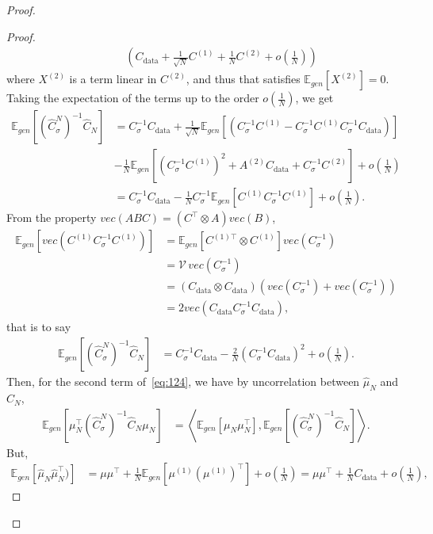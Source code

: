 \documentclass[11pt]{article}
\newcommand{\EE}{\mathbb{E}}
\begin{document}
\begin{proof}
\begin{proof}
\begin{align*}
&\qquad \nonumber \left(C_\mathrm{data} + \frac{1}{\sqrt{N}}   C^{(1)} + \frac{1}{N}  C^{(2)} + o\left( \frac{1}{N}\right)  \right) 
\end{align*}
where $X^{(2)}$ is a term linear in $C^{(2)}$, and thus that satisfies $\EE_{gen}[X^{(2)}] = 0$.
Taking the expectation of the terms up to the order $o\left( \frac{1}{N}\right)$, we get
\begin{align*}
\EE_{gen}\left[ (\hat C^N_\sigma)^{-1} \hat C_N \right] &= C_\sigma^{-1} C_\mathrm{data} + \frac{1}{\sqrt{N}} \EE_{gen}\left[\left(C_\sigma^{-1} C^{(1)} - C_\sigma^{-1} C^{(1)} C_\sigma^{-1} C_\mathrm{data}  \right)\right] \\&- \frac1N \EE_{gen}\left[(C_\sigma^{-1}   C^{(1)})^2 + A^{(2)}C_\mathrm{data} + C^{-1}_\sigma C^{(2)}\right] +   o\left( \frac1N\right) \\
&= C_\sigma^{-1} C_\mathrm{data} - \frac1N C_\sigma^{-1} \EE_{gen}\left[  C^{(1)} C_\sigma^{-1} C^{(1)}  \right] +   o\left( \frac1N\right).
\end{align*}
From the property $vec(ABC) = (C^\top \otimes A)vec(B)$, 
\begin{align*}
\EE_{gen}\left[vec(C^{(1)} C_\sigma^{-1} C^{(1)})\right] &= \EE_{gen}\left[C^{(1)\top} \otimes C^{(1)} \right] vec(C_\sigma^{-1}) \\
&= \mathcal{V} \, vec(C_\sigma^{-1}) \\
&= (C_\mathrm{data} \otimes C_\mathrm{data}) (vec(C_\sigma^{-1}) + vec(C_\sigma^{-1})) \\
&= 2 vec (C_\mathrm{data} C_\sigma^{-1} C_\mathrm{data}),
\end{align*}
that is to say
\begin{align} \label{eq:ExpCmC}
\EE_{gen} \left[ (\hat C^N_\sigma)^{-1} \hat C_N \right] &= C_\sigma^{-1} C_\mathrm{data} - \frac2N (C_\sigma^{-1} C_\mathrm{data})^2 + o\left( \frac1N\right) .
\end{align}
Then, for the second term of~\eqref{eq:124}, we have by uncorrelation between $\hat \mu_N$ and $\hat C_N$, 
\begin{align*}
\mathbb{E}_{gen} \left[ \mu_N^\top  (\hat C^N_\sigma)^{-1} \hat C_N  \mu_N \right] &=  \left\langle \mathbb{E}_{gen} \left[ \mu_N\mu_N^\top \right],  \mathbb{E}_{gen} \left[ (\hat C^N_\sigma)^{-1} \hat C_N \right]  \right\rangle .
\end{align*}
But,
\begin{align*}
\mathbb{E}_{gen} [ \hat \mu_N \hat \mu_N^\top )] &= \mu \mu^\top + \frac{1}{N} \EE_{gen}[\mu^{(1)}(\mu^{(1)})^\top] + o \left( \frac{1}{N}\right) = \mu \mu^\top +  \frac{1}{N} C_\mathrm{data} + o \left( \frac{1}{N}\right) ,

\end{align*}
\end{proof}
\end{proof}
\end{document}
